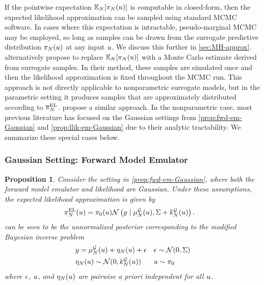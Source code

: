 \documentclass[12pt]{article}
\newtheorem{prop}{Proposition}
\begin{document}
 If the pointwise expectation 
 $\E_{\Ndesign}[\postEm[\Ndesign](\Par)]$ is computable in closed-form, then 
the expected likelihood approximation can be sampled using standard MCMC software.
In cases where this expectation is intractable, pseudo-marginal MCMC 
\citep{pseudoMarginalMCMC} may be employed, so long as 
samples can be drawn from the surrogate predictive distribution $\postEm[\Ndesign](\Par)$
at any input $\Par$. We discuss this further in \cref{sec:MH-approx}.
\citet{BurknerSurrogate} alternatively propose to replace  $\E_{\Ndesign}[\postEm[\Ndesign](\Par)]$
with a Monte Carlo estimate derived from surrogate samples. In their method, these samples 
are simulated once and then the likelihood approximation is fixed throughout the MCMC run. 
This approach is not directly applicable to nonparametric surrogate models, but in the parametric 
setting it produces samples that are approximately distributed according to 
$\postApproxNormMarg[\Ndesign]$. \citet{hydrologicalModel} propose a similar approach.
In the nonparametric case, most previous literature 
has focused on the Gaussian settings from \cref{prop:fwd-em-Gaussian} and \cref{prop:llik-em-Gaussian}
due to their analytic tractability. We summarize these special cases below.

\subsubsection{Gaussian Setting: Forward Model Emulator}
\begin{prop} \label{prop:post-approx-fwd-EL-Gaussian}
Consider the setting in \cref{prop:fwd-em-Gaussian}, where both the forward model emulator 
and likelihood are Gaussian. Under these assumptions, the expected likelihood approximation
is given by
\begin{align}
\postApproxMarg[\Ndesign](\Par) 
&= \priorDens(\Par) \Gaussian\left(\obs \given \emMean[\Ndesign]{\fwd}(\Par), \likPar + \emKer[\Ndesign]{\fwd}(\Par) \right). \label{eq:post-approx-fwd-EL-Gaussian}
\end{align}
 can be seen to be the unnormalized posterior corresponding to the modified
Bayesian inverse problem
\begin{align}
&\obs = \emMean[\Ndesign]{\fwd}(\Par) + \eta_{\Ndesign}(\Par) + \noise
&&\noise \sim \Gaussian(0, \likPar)  \label{inv_prob_Gaussian_modified} \\
&\eta_{\Ndesign}(\Par) \sim \Gaussian(0, \emKer[\Ndesign]{\fwd}(\Par))
&&\Par \sim \priorDens  \nonumber
\end{align}
where $\noise$, $\Par$, and $\eta_{\Ndesign}(\Par)$ are pairwise a priori independent for all $\Par$.
\end{prop}
\end{document}
